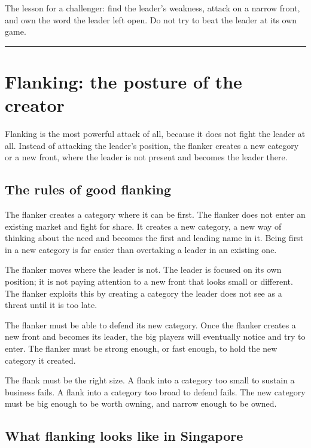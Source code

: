 \documentclass[10pt,twoside,openany]{memoir}
\newcommand{\needspacehead}{\needspace{4\baselineskip}}
\let\oldsection\section
\renewcommand{\section}{\needspacehead\oldsection}
\begin{document}
{The lesson for a challenger: find the leader's weakness, attack on a
narrow front, and own the word the leader left open. Do not try to beat
the leader at its own game.

\begin{center}\rule{0.5\linewidth}{0.5pt}\end{center}

\FloatBarrier
\chapter{Flanking: the posture of the
creator}\label{flanking-the-posture-of-the-creator}

Flanking is the most powerful attack of all, because it does not fight
the leader at all. Instead of attacking the leader's position, the
flanker creates a new category or a new front, where the leader is not
present and becomes the leader there.

\section{The rules of good flanking}\label{the-rules-of-good-flanking}

The flanker creates a category where it can be first. The flanker does
not enter an existing market and fight for share. It creates a new
category, a new way of thinking about the need and becomes the first and
leading name in it. Being first in a new category is far easier than
overtaking a leader in an existing one.

The flanker moves where the leader is not. The leader is focused on its
own position; it is not paying attention to a new front that looks small
or different. The flanker exploits this by creating a category the
leader does not see as a threat until it is too late.

The flanker must be able to defend its new category. Once the flanker
creates a new front and becomes its leader, the big players will
eventually notice and try to enter. The flanker must be strong enough,
or fast enough, to hold the new category it created.

The flank must be the right size. A flank into a category too small to
sustain a business fails. A flank into a category too broad to defend
fails. The new category must be big enough to be worth owning, and
narrow enough to be owned.

\section{What flanking looks like in
Singapore}\label{what-flanking-looks-like-in-singapore}

}
\end{document}

